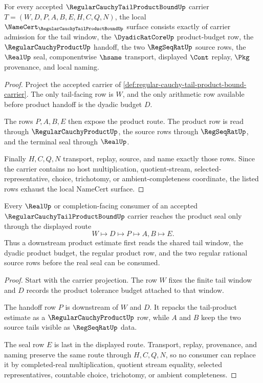 \begin{theorem}
\label{thm:regular-cauchy-tail-product-bound-obligation-surface}
For every accepted $\RegularCauchyTailProductBoundUp$ carrier $T=(W,D,P,A,B,E,H,C,Q,N)$, the local $\NameCert_{\RegularCauchyTailProductBoundUp}$ surface consists exactly of carrier admission for the tail window, the $\DyadicRatCoreUp$ product-budget row, the $\RegularCauchyProductUp$ handoff, the two $\RegSeqRatUp$ source rows, the $\RealUp$ seal, componentwise $\hsame$ transport, displayed $\Cont$ replay, $\Pkg$ provenance, and local naming.
\end{theorem}
\begin{proof}
Project the accepted carrier of \autoref{def:regular-cauchy-tail-product-bound-carrier}. The only tail-facing row is $W$, and the only arithmetic row available before product handoff is the dyadic budget $D$.

The rows $P,A,B,E$ then expose the product route. The product row is read through $\RegularCauchyProductUp$, the source rows through $\RegSeqRatUp$, and the terminal seal through $\RealUp$.

Finally $H,C,Q,N$ transport, replay, source, and name exactly those rows. Since the carrier contains no host multiplication, quotient-stream, selected-representative, choice, trichotomy, or ambient-completeness coordinate, the listed rows exhaust the local NameCert surface.
\end{proof}

\begin{theorem}
\label{thm:regular-cauchy-tail-product-bound-product-tail-handoff}
Every $\RealUp$ or completion-facing consumer of an accepted $\RegularCauchyTailProductBoundUp$ carrier reaches the product seal only through the displayed route
$$
W\longmapsto D\longmapsto P\longmapsto A,B\longmapsto E .
$$
Thus a downstream product estimate first reads the shared tail window, the dyadic product budget, the regular product row, and the two regular rational source rows before the real seal can be consumed.
\end{theorem}
\begin{proof}
Start with the carrier projection. The row $W$ fixes the finite tail window and $D$ records the product tolerance budget attached to that window.

The handoff row $P$ is downstream of $W$ and $D$. It repacks the tail-product estimate as a $\RegularCauchyProductUp$ row, while $A$ and $B$ keep the two source tails visible as $\RegSeqRatUp$ data.

The seal row $E$ is last in the displayed route. Transport, replay, provenance, and naming preserve the same route through $H,C,Q,N$, so no consumer can replace it by completed-real multiplication, quotient stream equality, selected representatives, countable choice, trichotomy, or ambient completeness.
\end{proof}

